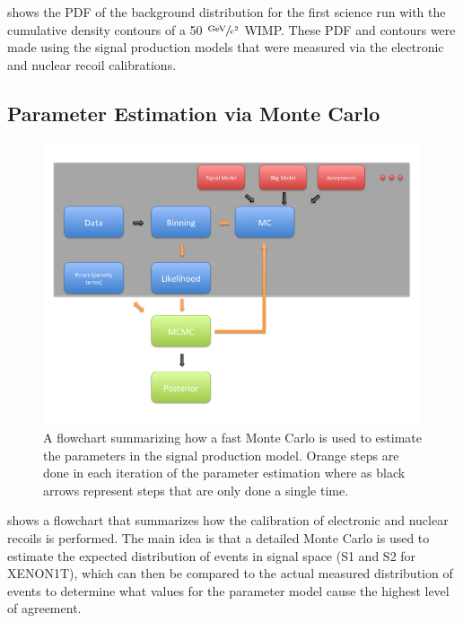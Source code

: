  shows the PDF of the background distribution for the first science run with the cumulative density contours of a 50 $\sfrac{\textrm{GeV}}{\textrm{c}^2}$ WIMP.  These PDF and contours were made using the signal production models that were measured via the electronic and nuclear recoil calibrations.



\subsection{Parameter Estimation via Monte Carlo}


\begin{figure}
        \centering
	\includegraphics[width=0.99\textwidth]{xe1t_fast_mc_flowchart}
	\caption{A flowchart summarizing how a fast Monte Carlo is used to estimate the parameters in the signal production model.  Orange steps are done in each iteration of the parameter estimation where as black arrows represent steps that are only done a single time.}
	\label{fig:xe1t_fast_mc_flowchart}
\end{figure}


 shows a flowchart that summarizes how the calibration of electronic and nuclear recoils is performed.  The main idea is that a detailed Monte Carlo is used to estimate the expected distribution of events in signal space (S1 and S2 for XENON1T), which can then be compared to the actual measured distribution of events to determine what values for the parameter model cause the highest level of agreement. 

